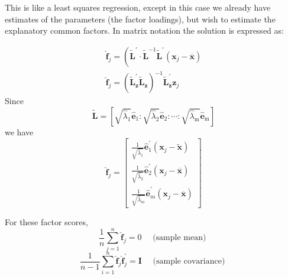 \documentclass[12pt]{article}
\numberwithin{equation}{section}
\begin{document}
\noindent This is like a least squares regression, except in this case we already have
estimates of the parameters (the factor loadings), but wish to estimate the
explanatory common factors. In matrix notation the solution is expressed as:

$$
\begin{gathered}
	\hat{\mathbf{f}}_j=\left(\tilde{\mathbf{L}}^{\prime} \cdot \tilde{\mathbf{L}}^{-1} \widetilde{\mathbf{L}}^{\prime}\left(\mathbf{x}_j-\overline{\mathbf{x}}\right)\right. \\
	\hat{\mathbf{f}}_j=\left(\tilde{\mathbf{L}}_{\mathbf{z}}^{\prime} \tilde{\mathbf{L}}_{\mathbf{z}}\right)^{-1} \widetilde{\mathbf{L}}_{\mathbf{z}}^{\prime} \mathbf{z}_j
\end{gathered}
$$
Since 
$$
\tilde{\mathbf{L}}=\left[\sqrt{\hat{\lambda}_1} \hat{\mathbf{e}}_1: \sqrt{\hat{\lambda}_2} \hat{\mathbf{e}}_2: \cdots: \sqrt{\hat{\lambda}_{\mathrm{m}}} \hat{\mathbf{e}}_{\mathrm{m}}\right]
$$
we have
$$
\hat{\mathbf{f}}_j=\left[\begin{array}{c}
	\frac{1}{\sqrt{\hat{\lambda}_1}} \hat{\mathbf{e}}_1^{\prime}\left(\mathbf{x}_j-\tilde{\mathbf{x}}\right) \\
	\frac{1}{\sqrt{\hat{\lambda}_2}} \hat{\mathbf{e}}_2^{\prime}\left(\mathbf{x}_j-\overline{\mathbf{x}}\right) \\
	\frac{1}{\sqrt{\hat{\lambda}_m}} \hat{\mathbf{e}}_m^{\prime}\left(\mathbf{x}_j-\overline{\mathbf{x}}\right)
\end{array}\right]
$$

For these factor scores,
$$
\frac{1}{n} \sum_{j=1}^n \hat{\mathbf{f}}_j=0 \quad \text { (sample mean) }
$$
$$
\frac{1}{n-1} \sum_{i=1}^n \hat{\mathbf{f}}_j \hat{\mathbf{f}}_j^{\prime}=\mathbf{I} \quad \text { (sample covariance) }
$$



\newpage
\end{document}
